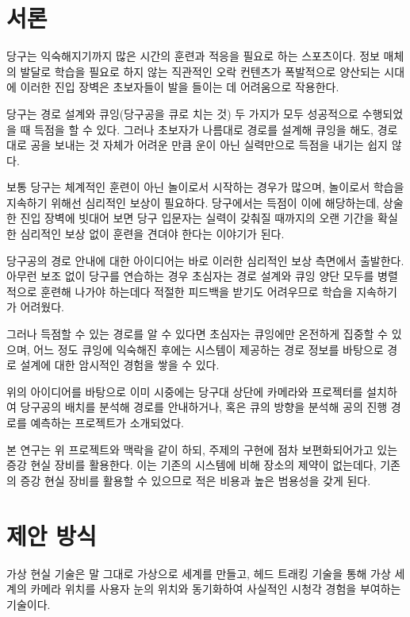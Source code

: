 \documentclass[10pt]{oblivoir}
\begin{document}
\section{서론}
당구는 익숙해지기까지 많은 시간의 훈련과 적응을 필요로 하는 스포츠이다. 정보 매체의 발달로 학습을 필요로 하지 않는 직관적인 오락 컨텐츠가 폭발적으로 양산되는 시대에 이러한 진입 장벽은 초보자들이 발을 들이는 데 어려움으로 작용한다.

당구는 경로 설계와 큐잉(당구공을 큐로 치는 것) 두 가지가 모두 성공적으로 수행되었을 때 득점을 할 수 있다. 그러나 초보자가 나름대로 경로를 설계해 큐잉을 해도, 경로대로 공을 보내는 것 자체가 어려운 만큼 운이 아닌 실력만으로 득점을 내기는 쉽지 않다.

보통 당구는 체계적인 훈련이 아닌 놀이로서 시작하는 경우가 많으며, 놀이로서 학습을 지속하기 위해선 심리적인 보상이 필요하다. 당구에서는 득점이 이에 해당하는데, 상술한 진입 장벽에 빗대어 보면 당구 입문자는 실력이 갖춰질 때까지의 오랜 기간을 확실한 심리적인 보상 없이 훈련을 견뎌야 한다는 이야기가 된다.


당구공의 경로 안내에 대한 아이디어는 바로 이러한 심리적인 보상 측면에서 출발한다. 아무런 보조 없이 당구를 연습하는 경우 초심자는 경로 설계와 큐잉 양단 모두를 병렬적으로 훈련해 나가야 하는데다 적절한 피드백을 받기도 어려우므로 학습을 지속하기가 어려웠다. 

그러나 득점할 수 있는 경로를 알 수 있다면 초심자는 큐잉에만 온전하게 집중할 수 있으며, 어느 정도 큐잉에 익숙해진 후에는 시스템이 제공하는 경로 정보를 바탕으로 경로 설계에 대한 암시적인 경험을 쌓을 수 있다.

위의 아이디어를 바탕으로 이미 시중에는 당구대 상단에 카메라와 프로젝터를 설치하여 당구공의 배치를 분석해 경로를 안내하거나, 혹은 큐의 방향을 분석해 공의 진행 경로를 예측하는 프로젝트가 소개되었다.
\cite{AR-Pool-Projector} \cite{AR-Pool-Projector-2}

본 연구는 위 프로젝트와 맥락을 같이 하되, 주제의 구현에 점차 보편화되어가고 있는 증강 현실 장비를 활용한다. 이는 기존의 시스템에 비해 장소의 제약이 없는데다, 기존의 증강 현실 장비를 활용할 수 있으므로 적은 비용과 높은 범용성을 갖게 된다.


\section{제안 방식}
가상 현실 기술은 말 그대로 가상으로 세계를 만들고, 헤드 트래킹 기술을 통해 가상 세계의 카메라 위치를 사용자 눈의 위치와 동기화하여 사실적인 시청각 경험을 부여하는 기술이다.
\end{document}
